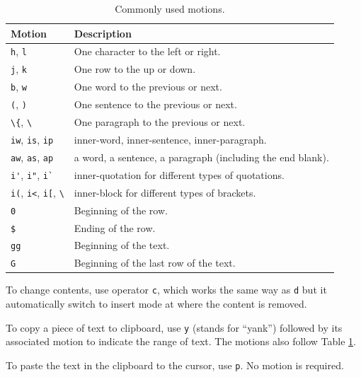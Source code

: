 \begin{table}
  \centering \caption{Commonly used motions.}\label{ch3tab:motion}
  \begin{tabularx}{\textwidth}{lX}
    \hline
    Motion & Description \\ \hline
    \verb|h|, \verb|l| & One character to the left or right. \\ \hdashline
    \verb|j|, \verb|k| & One row to the up or down. \\ \hdashline
    \verb|b|, \verb|w| & One word to the previous or next. \\ \hdashline
    \verb|(|, \verb|)| & One sentence to the previous or next. \\ \hdashline
    \lstinline{\{}, \lstinline{\}} & One paragraph to the previous or next. \\ \hdashline
    \verb|iw|, \verb|is|, \verb|ip| & inner-word, inner-sentence, inner-paragraph. \\ \hdashline
    \verb|aw|, \verb|as|, \verb|ap| & a word, a sentence, a paragraph (including the end blank). \\ \hdashline
    \verb|i'|, \verb|i"|, \verb|i`| & inner-quotation for different types of quotations. \\ \hdashline
    \verb|i(|, \verb|i<|, \verb|i[|, \lstinline{\}} & inner-block for different types of brackets. \\ \hdashline
    \verb|0| & Beginning of the row. \\ \hdashline
    \verb|$| & Ending of the row. \\ \hdashline
    \verb|gg| & Beginning of the text. \\ \hdashline
    \verb|G| & Beginning of the last row of the text. \\
    \hline
  \end{tabularx}
\end{table}

To change contents, use operator \verb|c|, which works the same way as \verb|d| but it automatically switch to insert mode at where the content is removed.

To copy a piece of text to clipboard, use \verb|y| (stands for ``yank'') followed by its associated motion to indicate the range of text. The motions also follow Table \ref{ch3tab:motion}.

To paste the text in the clipboard to the cursor, use \verb|p|. No motion is required.


